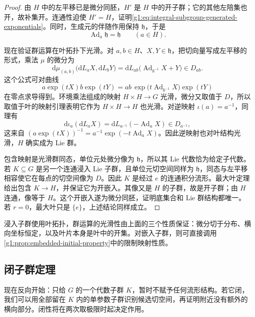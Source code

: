 \begin{proof}
	由 \(H\) 中的左平移已是微分同胚，\(H'\) 是 \(H\) 中的开子群；它的其他左陪集也开，故补集开。连通性迫使 \(H'=H\)，证明\eqref{g1:eq:integral-subgroup-generated-exponentials}。同时，生成元的伴随作用保持 \(\mathfrak h\)，于是
	\[
		\operatorname{Ad}_a\mathfrak h=\mathfrak h\qquad(a\in H).
	\]

	现在验证群运算在叶拓扑下光滑。对 \(a,b\in H\)、\(X,Y\in\mathfrak h\)，把切向量写成左平移的形式，乘法 \(\mu\) 的微分为
	\begin{equation}\label{g1:eq:subgroup-multiplication-differential}
		\mathrm{d}\mu_{(a,b)}\bigl(\mathrm{d}L_aX,\mathrm{d}L_bY\bigr)
		=\mathrm{d}L_{ab}\bigl(\operatorname{Ad}_{b^{-1}}X+Y\bigr)\in D_{ab}.
	\end{equation}
	这个公式可对曲线
	\[
		a\exp(tX)b\exp(tY)
		=ab\,\exp\bigl(t\operatorname{Ad}_{b^{-1}}X\bigr)\exp(tY)
	\]
	在零点求导得到。环境乘法组成的映射 \(H\times H\to G\) 光滑，微分又取值于 \(D\)，所以取值于叶的映射引理表明它作为 \(H\times H\to H\) 也光滑。对逆映射 \(\iota(a)=a^{-1}\)，同理有
	\[
		\mathrm{d}\iota_a(\mathrm{d}L_aX)
		=\mathrm{d}L_{a^{-1}}(-\operatorname{Ad}_aX)\in D_{a^{-1}},
	\]
	这来自 \((a\exp(tX))^{-1}=a^{-1}\exp(-t\operatorname{Ad}_aX)\)。因此逆映射也对叶结构光滑，\(H\) 确实成为 Lie 群。

	包含映射是光滑群同态，单位元处微分像为 \(\mathfrak h\)，所以其 Lie 代数恰为给定子代数。若 \(K\subseteq G\) 是另一个连通浸入 Lie 子群，且单位元切空间同样为 \(\mathfrak h\)，同态与左平移相容使它在每点的切空间像为 \(D\)。因此 \(K\) 是经过 \(e\) 的连通积分流形。最大叶定理给出包含 \(K\to H\)，并保证它为开嵌入。其像又是 \(H\) 的子群，故是开子群；由 \(H\) 连通，像等于 \(H\)。这个开嵌入遂为微分同胚，证明底集合和 Lie 群结构都唯一。若 \(r=0\)，最大叶只是 \(\{e\}\)，上述结论同样成立。
\end{proof}

浸入子群使用叶拓扑，群运算的光滑性由上面的三个性质保证：微分切于分布、横向坐标恒定，以及叶片本身是叶中的开集。对嵌入子群，则可直接调用\cref{g1:prop:embedded-initial-property}中的限制映射性质。

\subsection{闭子群定理}
\label{g1:subsec:1603:03}

现在反向开始：只给 \(G\) 的一个代数子群 \(K\)，暂时不赋予任何流形结构。若它闭，我们可以用全部留在 \(K\) 内的单参数子群识别候选切空间，再证明附近没有额外的横向部分。闭性将在两次取极限时起决定作用。

